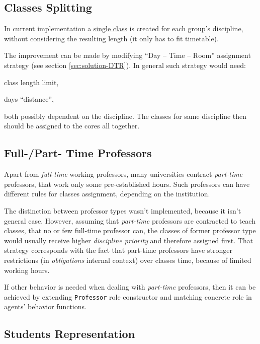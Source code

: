 \documentclass[ThesisDoc]{subfiles}
\begin{document}
\subsection{Classes Splitting}

In current implementation a \underline{single class} is created for each
group's discipline, without considering the resulting length
(it only has to fit timetable).

The improvement can be made by modifying ``Day -- Time -- Room''
assignment strategy (see section \ref{sec:solution-DTR}).
In general such strategy would need:
\begin{enumerate*}[1)]
  \item class length limit,
  \item days ``distance'',
\end{enumerate*}
both possibly dependent on the discipline.
The classes for same discipline then should be assigned to the cores all together.

\subsection{Full-/Part- Time Professors}
Apart from \emph{full-time} working professors, many universities contract
\emph{part-time} professors, that work only some pre-established hours.
Such professors can have different rules for classes assignment, depending on
the institution.

The distinction between professor types wasn't implemented, because it isn't
general case. However, assuming that \emph{part-time} professors are contracted
to teach classes, that no or few full-time professor can, the classes of former
professor type would usually receive higher \emph{discipline priority} and
therefore assigned first. That strategy corresponds with the fact that part-time
professors have stronger restrictions (in \emph{obligations} internal context)
over classes time, because of limited working hours.

If other behavior is needed when dealing with \emph{part-time} professors, then
it can be achieved by extending \texttt{Professor} role constructor and matching
concrete role in agents' behavior functions.

\subsection{Students Representation}
\end{document}
